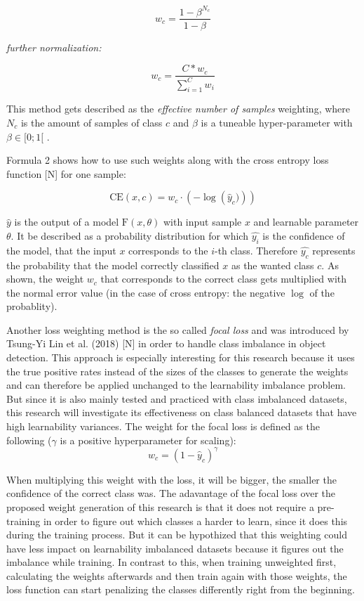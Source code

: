 \documentclass[journal]{IEEEtran}
\begin{document}
\[ w_c = \frac{1-\beta^{N_c}}{1-\beta} \]

\emph{further normalization:}

\[ w_c = \frac{C * w_c}{\sum_{i=1}^{C}w_i} \]

This method gets described as the \emph{effective number of samples} weighting, where $N_c$ is the amount of samples of class $c$ and $\beta$ is a tuneable hyper-parameter with $\beta \in [0;1[$ .

Formula 2 shows how to use such weights along with the cross entropy loss function [N] for one sample:

\[ \text{CE}(x, c) = w_{c} \cdot \left(-\log\left(\hat{y}_c)\right) \right) \]

$\hat{y}$ is the output of a model $\text{F}(x, \theta)$ with input sample $x$ and learnable parameter $\theta$. 
It be described as a probability distribution for which $\hat{y_i}$ is the confidence of the model, that the input $x$ corresponds to the $i$-th class.
Therefore $\hat{y_c}$ represents the probability that the model correctly classified $x$ as the wanted class $c$. 
As shown, the weight $w_c$ that corresponds to the correct class gets multiplied with the normal error value (in the case of cross entropy: the negative $\log$ of the probablity).

Another loss weighting method is the so called \emph{focal loss} and was introduced by Tsung-Yi Lin et al. (2018) [N] in order to handle class imbalance in object detection.
This approach is especially interesting for this research because it uses the true positive rates instead of the sizes of the classes to generate the weights and can therefore be applied unchanged to the learnability imbalance problem.
But since it is also mainly tested and practiced with class imbalanced datasets, this research will investigate its effectiveness on class balanced datasets that have high learnability variances.
The weight for the focal loss is defined as the following ($\gamma$ is a positive hyperparameter for scaling):
\[ w_c = (1 - \hat{y}_c)^\gamma \]

When multiplying this weight with the loss, it will be bigger, the smaller the confidence of the correct class was. 
The adavantage of the focal loss over the proposed weight generation of this research is that it does not require a pre-training in order to figure out which classes a harder to learn, since it does this during the training process.
But it can be hypothized that this weighting could have less impact on learnability imbalanced datasets because it figures out the imbalance while training.
In contrast to this, when training unweighted first, calculating the weights afterwards and then train again with those weights, the loss function can start penalizing the classes differently right from the beginning.
\end{document}
